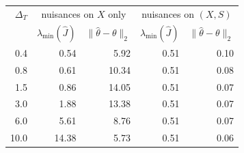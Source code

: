 \begin{tabular}{rrrrr}
\toprule
$\Delta_T$ & \multicolumn{2}{c}{nuisances on $X$ only} & \multicolumn{2}{c}{nuisances on $(X,S)$} \\
 & $\lambda_{\min}(\hat J)$ & $\|\hat\theta-\theta\|_2$ & $\lambda_{\min}(\hat J)$ & $\|\hat\theta-\theta\|_2$ \\
\midrule
0.4 & 0.54 & 5.92 & 0.51 & 0.10 \\
0.8 & 0.61 & 10.34 & 0.51 & 0.08 \\
1.5 & 0.86 & 14.05 & 0.51 & 0.07 \\
3.0 & 1.88 & 13.38 & 0.51 & 0.07 \\
6.0 & 5.61 & 8.76 & 0.51 & 0.07 \\
10.0 & 14.38 & 5.73 & 0.51 & 0.06 \\
\bottomrule
\end{tabular}